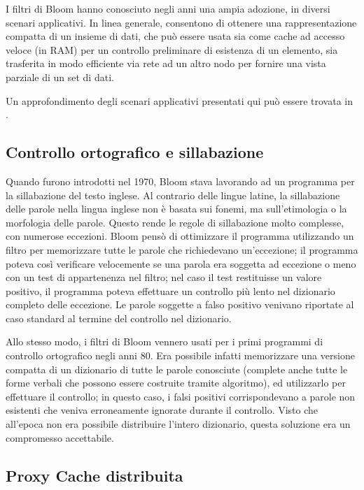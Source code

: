 I filtri di Bloom hanno conosciuto negli anni una ampia adozione, in diversi scenari applicativi. 
In linea generale, consentono di ottenere una rappresentazione compatta di un insieme di dati,
che può essere usata sia come cache ad accesso veloce (in RAM) per un controllo preliminare
di esistenza di un elemento, sia trasferita in modo efficiente via rete ad un altro nodo per
fornire una vista parziale di un set di dati.

Un approfondimento degli scenari applicativi presentati qui può essere trovata in
\cite{bloom-network}.

\subsection{Controllo ortografico e sillabazione}

Quando furono introdotti nel 1970, Bloom stava lavorando ad un programma per la sillabazione del
testo inglese. Al contrario delle lingue latine, la sillabazione delle parole nella lingua inglese 
non è basata sui fonemi, ma sull'etimologia o la morfologia delle parole. Questo rende le regole
di sillabazione molto complesse, con numerose eccezioni. Bloom pensò di ottimizzare il programma
utilizzando un filtro per memorizzare tutte le parole che richiedevano un'eccezione; il programma
poteva così verificare velocemente se una parola era soggetta ad eccezione o meno con un test
di appartenenza nel filtro; nel caso il test restituisse un valore positivo, il programma poteva
effettuare un controllo più lento nel dizionario completo delle eccezione. Le parole soggette
a falso positivo venivano riportate al caso standard al termine del controllo nel dizionario.

Allo stesso modo, i filtri di Bloom vennero usati per i primi programmi di controllo ortografico
negli anni 80. Era possibile infatti memorizzare una versione compatta di un dizionario di tutte le
parole conosciute (complete anche tutte le forme verbali che possono essere costruite tramite
algoritmo), ed utilizzarlo per effettuare il controllo; in questo caso, i falsi positivi
corrispondevano a parole non esistenti che veniva erroneamente ignorate durante il controllo. Visto
che all'epoca non era possibile distribuire l'intero dizionario, questa soluzione era un compromesso
accettabile.

\subsection{Proxy Cache distribuita}

